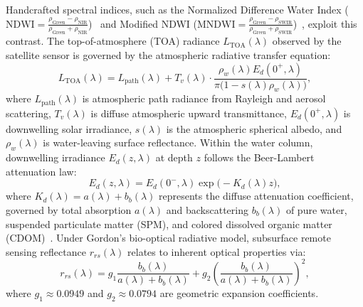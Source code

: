 Handcrafted spectral indices, such as the Normalized Difference Water Index ($\mathrm{NDWI} = \frac{\rho_{\text{Green}} - \rho_{\text{NIR}}}{\rho_{\text{Green}} + \rho_{\text{NIR}}}$)~\cite{mcfreeters1996use} and Modified NDWI ($\mathrm{MNDWI} = \frac{\rho_{\text{Green}} - \rho_{\text{SWIR}}}{\rho_{\text{Green}} + \rho_{\text{SWIR}}}$)~\cite{xu2006modification}, exploit this contrast. The top-of-atmosphere (TOA) radiance $L_{\text{TOA}}(\lambda)$ observed by the satellite sensor is governed by the atmospheric radiative transfer equation:
\begin{equation}
    L_{\text{TOA}}(\lambda) = L_{\text{path}}(\lambda) + T_v(\lambda) \cdot \frac{\rho_w(\lambda) E_d(0^+, \lambda)}{\pi \big(1 - s(\lambda) \rho_w(\lambda)\big)},
    \label{eq:rad_transfer}
\end{equation}
where $L_{\text{path}}(\lambda)$ is atmospheric path radiance from Rayleigh and aerosol scattering, $T_v(\lambda)$ is diffuse atmospheric upward transmittance, $E_d(0^+, \lambda)$ is downwelling solar irradiance, $s(\lambda)$ is the atmospheric spherical albedo, and $\rho_w(\lambda)$ is water-leaving surface reflectance. Within the water column, downwelling irradiance $E_d(z, \lambda)$ at depth $z$ follows the Beer-Lambert attenuation law:
\begin{equation}
    E_d(z, \lambda) = E_d(0^-, \lambda) \exp\big(-K_d(\lambda) z\big),
\end{equation}
where $K_d(\lambda) = a(\lambda) + b_b(\lambda)$ represents the diffuse attenuation coefficient, governed by total absorption $a(\lambda)$ and backscattering $b_b(\lambda)$ of pure water, suspended particulate matter (SPM), and colored dissolved organic matter (CDOM)~\cite{rahimzadegan2021surface}. Under Gordon's bio-optical radiative model, subsurface remote sensing reflectance $r_{rs}(\lambda)$ relates to inherent optical properties via:
\begin{equation}
    r_{rs}(\lambda) = g_1 \frac{b_b(\lambda)}{a(\lambda) + b_b(\lambda)} + g_2 \left(\frac{b_b(\lambda)}{a(\lambda) + b_b(\lambda)}\right)^2,
\end{equation}
where $g_1 \approx 0.0949$ and $g_2 \approx 0.0794$ are geometric expansion coefficients. 

